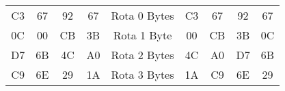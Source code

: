 \begin{tabular}{|c|c|c|c|c|c|c|c|c|}
  \cline{1-4} \cline{6-9}
  C3 & 67 & 92 & 67 & Rota 0 Bytes & C3 & 67 & 92 & 67 \\ \cline{1-4} \cline{6-9} 
  \cellcolor[HTML]{FFCCC9}0C & 00 & CB & 3B & Rota 1 Byte & 00 & CB & 3B & \cellcolor[HTML]{FFCCC9}0C \\ \cline{1-4} \cline{6-9} 
  \cellcolor[HTML]{9AFF99}D7 & \cellcolor[HTML]{9AFF99}6B & 4C & A0 & Rota 2 Bytes & 4C & A0 & \cellcolor[HTML]{9AFF99}D7 & \cellcolor[HTML]{9AFF99}6B \\ \cline{1-4} \cline{6-9} 
  \cellcolor[HTML]{FFFC9E}C9 & \cellcolor[HTML]{FFFC9E}6E & \cellcolor[HTML]{FFFC9E}29 & 1A & Rota 3 Bytes & 1A & \cellcolor[HTML]{FFFC9E}C9 & \cellcolor[HTML]{FFFC9E}6E & \cellcolor[HTML]{FFFC9E}29 \\ \cline{1-4} \cline{6-9} 
\end{tabular}